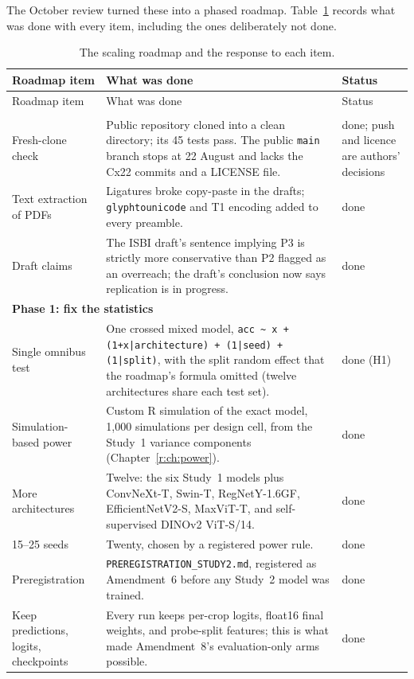 The October review turned these into a phased roadmap. Table~\ref{r:tab:roadmap} records what was done with every
item, including the ones deliberately not done.

{\small
\begin{longtable}{p{}p{}p{}}
\caption{The scaling roadmap and the response to each item.}\label{r:tab:roadmap}\\
\toprule
Roadmap item & What was done & Status \\
\midrule
\endfirsthead
\toprule
Roadmap item & What was done & Status \\
\midrule
\endhead
\bottomrule
\endfoot
\multicolumn{3}{l}{\textbf{Phase 0: arXiv readiness}} \\
Fresh-clone check & Public repository cloned into a clean directory; its 45 tests pass. The public \texttt{main} branch stops at 22 August and lacks the Cx22 commits and a LICENSE file. & done; push and licence are authors' decisions \\
Text extraction of PDFs & Ligatures broke copy-paste in the drafts; \texttt{glyphtounicode} and T1 encoding added to every preamble. & done \\
Draft claims & The ISBI draft's sentence implying P3 is strictly more conservative than P2 flagged as an overreach; the draft's conclusion now says replication is in progress. & done \\
\multicolumn{3}{l}{\textbf{Phase 1: fix the statistics}} \\
Single omnibus test & One crossed mixed model, \texttt{acc \textasciitilde{} x + (1+x|architecture) + (1|seed) + (1|split)}, with the split random effect that the roadmap's formula omitted (twelve architectures share each test set). & done (H1) \\
Simulation-based power & Custom R simulation of the exact model, 1,000 simulations per design cell, from the Study~1 variance components (Chapter~\ref{r:ch:power}). & done \\
More architectures & Twelve: the six Study~1 models plus ConvNeXt-T, Swin-T, RegNetY-1.6GF, EfficientNetV2-S, MaxViT-T, and self-supervised DINOv2 ViT-S/14. & done \\
15--25 seeds & Twenty, chosen by a registered power rule. & done \\
Preregistration & \texttt{PREREGISTRATION\_STUDY2.md}, registered as Amendment~6 before any Study~2 model was trained. & done \\
Keep predictions, logits, checkpoints & Every run keeps per-crop logits, float16 final weights, and probe-split features; this is what made Amendment~8's evaluation-only arms possible. & done \\

\end{longtable}}
